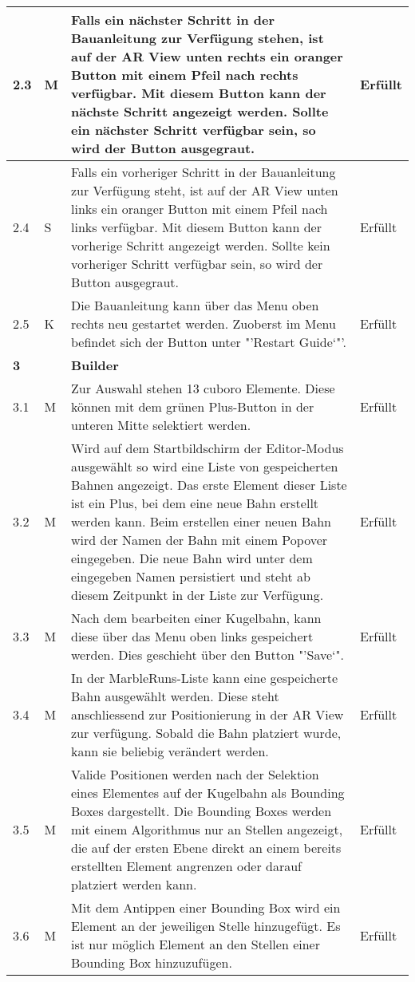 \begin{longtable}{l l p{10cm} l}
	\hline
	2.3 & M & Falls ein nächster Schritt in der Bauanleitung zur Verfügung stehen, ist auf der AR View unten rechts ein oranger Button mit einem Pfeil nach rechts verfügbar. Mit diesem Button kann der nächste Schritt angezeigt werden. Sollte ein nächster Schritt verfügbar sein, so wird der Button ausgegraut. & Erfüllt \\
	\hline
	2.4 & S & Falls ein vorheriger Schritt in der Bauanleitung zur Verfügung steht, ist auf der AR View unten links ein oranger Button mit einem Pfeil nach links verfügbar. Mit diesem Button kann der vorherige Schritt angezeigt werden. Sollte kein vorheriger Schritt verfügbar sein, so wird der Button ausgegraut. & Erfüllt \\
	\hline
	2.5 & K & Die Bauanleitung kann über das Menu oben rechts neu gestartet werden. Zuoberst im Menu befindet sich der Button unter "'Restart Guide`"'. & Erfüllt \\
	\hline
	\textbf{3} & & \textbf{Builder} & \\
	\hline
	3.1 & M & Zur Auswahl stehen 13 cuboro Elemente. Diese können mit dem grünen Plus-Button in der unteren Mitte selektiert werden. & Erfüllt \\
	\hline
	3.2 & M & Wird auf dem Startbildschirm der Editor-Modus ausgewählt so wird eine Liste von gespeicherten Bahnen angezeigt. Das erste Element dieser Liste ist ein Plus, bei dem eine neue Bahn erstellt werden kann. Beim erstellen einer neuen Bahn wird der Namen der Bahn mit einem Popover eingegeben. Die neue Bahn wird unter dem eingegeben Namen persistiert und steht ab diesem Zeitpunkt in der Liste zur Verfügung. & Erfüllt \\
	\hline
	3.3 & M & Nach dem bearbeiten einer Kugelbahn, kann diese über das Menu oben links gespeichert werden. Dies geschieht über den Button "'Save`". & Erfüllt \\
	\hline
	3.4 & M & In der MarbleRuns-Liste kann eine gespeicherte Bahn ausgewählt werden. Diese steht anschliessend zur Positionierung in der AR View zur verfügung. Sobald die Bahn platziert wurde, kann sie beliebig verändert werden. & Erfüllt \\
	\hline
	3.5 & M & Valide Positionen werden nach der Selektion eines Elementes auf der Kugelbahn als Bounding Boxes dargestellt. Die Bounding Boxes werden mit einem Algorithmus nur an Stellen angezeigt, die auf der ersten Ebene direkt an einem bereits erstellten Element angrenzen oder darauf platziert werden kann. & Erfüllt \\
	\hline
	3.6 & M & Mit dem Antippen einer Bounding Box wird ein Element an der jeweiligen Stelle hinzugefügt. Es ist nur möglich Element an den Stellen einer Bounding Box hinzuzufügen. & Erfüllt \\

\end{longtable}
